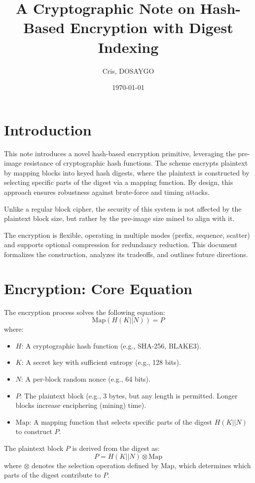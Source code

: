 \documentclass[11pt,a4paper]{article}
\title{A Cryptographic Note on Hash-Based Encryption with Digest Indexing}
\author{Cris, DOSAYGO}
\date{\today}
\begin{document}
\maketitle

\section*{Introduction}

This note introduces a novel hash-based encryption primitive, leveraging the pre-image resistance of cryptographic hash functions. The scheme encrypts plaintext by mapping blocks into keyed hash digests, where the plaintext is constructed by selecting specific parts of the digest via a mapping function. By design, this approach ensures robustness against brute-force and timing attacks.

Unlike a regular block cipher, the security of this system is not affected by the plaintext block size, but rather by the pre-image size mined to align with it.

The encryption is flexible, operating in multiple modes (prefix, sequence, scatter) and supports optional compression for redundancy reduction. This document formalizes the construction, analyzes its tradeoffs, and outlines future directions.

\section*{Encryption: Core Equation}

The encryption process solves the following equation:
\[
\text{Map}(H(K || N)) = P
\]
where:
\begin{itemize}
  \item \( H \): A cryptographic hash function (e.g., SHA-256, BLAKE3).
  \item \( K \): A secret key with sufficient entropy (e.g., 128 bits).
  \item \( N \): A per-block random nonce (e.g., 64 bits).
  \item \( P \): The plaintext block (e.g., 3 bytes, but any length is permitted. Longer blocks increase enciphering (mining) time).
  \item \( \text{Map} \): A mapping function that selects specific parts of the digest \( H(K || N) \) to construct \( P \).
\end{itemize}

The plaintext block \( P \) is derived from the digest as:
\[
P = H(K || N) \otimes \text{Map}
\]
where \( \otimes \) denotes the selection operation defined by \( \text{Map} \), which determines which parts of the digest contribute to \( P \).
\end{document}
